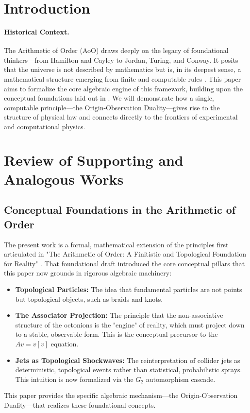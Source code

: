 \documentclass[11pt, a4paper]{article}
\theoremstyle{definition}
\theoremstyle{remark}
\begin{document}
\tableofcontents
\newpage

\section*{Introduction}
\paragraph{Historical Context.}
The Arithmetic of Order (AoO) draws deeply on the legacy of foundational thinkers—from Hamilton and Cayley to Jordan, Turing, and Conway. It posits that the universe is not described by mathematics but is, in its deepest sense, a mathematical structure emerging from finite and computable rules \cite{EK2025a, EK2025c}. This paper aims to formalize the core algebraic engine of this framework, building upon the conceptual foundations laid out in \cite{EK2025Hardron}. We will demonstrate how a single, computable principle—the Origin-Observation Duality—gives rise to the structure of physical law and connects directly to the frontiers of experimental and computational physics.

\section{Review of Supporting and Analogous Works}

\subsection{Conceptual Foundations in the Arithmetic of Order}
The present work is a formal, mathematical extension of the principles first articulated in "The Arithmetic of Order: A Finitistic and Topological Foundation for Reality" \cite{EK2025Hardron}. That foundational draft introduced the core conceptual pillars that this paper now grounds in rigorous algebraic machinery:
\begin{itemize}
    \item \textbf{Topological Particles:} The idea that fundamental particles are not points but topological objects, such as braids and knots.
    \item \textbf{The Associator Projection:} The principle that the non-associative structure of the octonions is the "engine" of reality, which must project down to a stable, observable form. This is the conceptual precursor to the $Av=v[v]$ equation.
    \item \textbf{Jets as Topological Shockwaves:} The reinterpretation of collider jets as deterministic, topological events rather than statistical, probabilistic sprays. This intuition is now formalized via the $G_2$ automorphism cascade.
\end{itemize}
This paper provides the specific algebraic mechanism—the Origin-Observation Duality—that realizes these foundational concepts.
\end{document}
